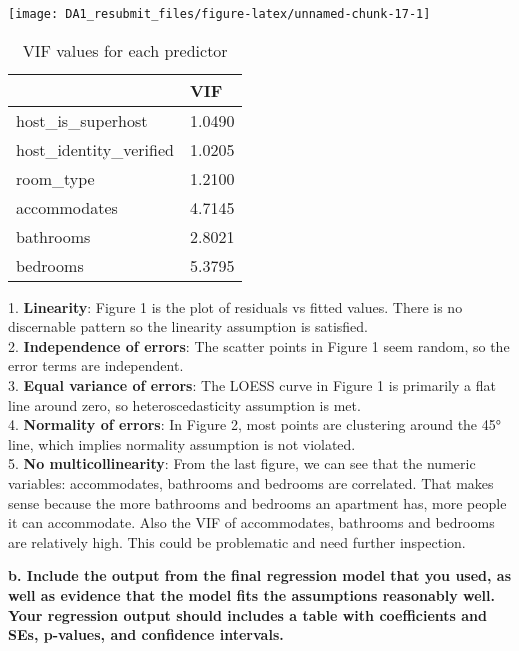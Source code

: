 \documentclass[
]{article}
\begin{document}
\begin{center}\texttt{[image: DA1\_resubmit\_files/figure-latex/unnamed-chunk-17-1]} \end{center}

\begin{table}[!h]

\caption{\label{tab:unnamed-chunk-17}VIF values for each predictor}
\centering
\begin{tabu} to 
\hline
  & VIF\\
\hline
host\_is\_superhost & 1.0490\\
\hline
host\_identity\_verified & 1.0205\\
\hline
room\_type & 1.2100\\
\hline
accommodates & 4.7145\\
\hline
bathrooms & 2.8021\\
\hline
bedrooms & 5.3795\\
\hline
\end{tabu}
\end{table}

1. \textbf{Linearity}: Figure 1 is the plot of residuals vs fitted
values. There is no discernable pattern so the linearity assumption is
satisfied.\\
2. \textbf{Independence of errors}: The scatter points in Figure 1 seem
random, so the error terms are independent.\\
3. \textbf{Equal variance of errors}: The LOESS curve in Figure 1 is
primarily a flat line around zero, so heteroscedasticity assumption is
met.\\
4. \textbf{Normality of errors}: In Figure 2, most points are clustering
around the 45° line, which implies normality assumption is not
violated.\\
5. \textbf{No multicollinearity}: From the last figure, we can see that
the numeric variables: accommodates, bathrooms and bedrooms are
correlated. That makes sense because the more bathrooms and bedrooms an
apartment has, more people it can accommodate. Also the VIF of
accommodates, bathrooms and bedrooms are relatively high. This could be
problematic and need further inspection.

\textbf{b. Include the output from the final regression model that you
used, as well as evidence that the model fits the assumptions reasonably
well. Your regression output should includes a table with coefficients
and SEs, p-values, and confidence intervals.}
\end{document}
